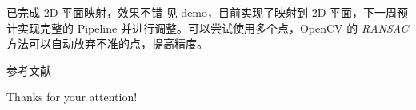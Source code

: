 \documentclass{ctexbeamer}
\begin{document}
\begin{frame}{已完成 2D 平面映射，效果不错}
见 demo，目前实现了映射到 2D 平面，下一周预计实现完整的 Pipeline 并进行调整。可以尝试使用多个点，OpenCV 的 \textit{RANSAC} 方法可以自动放弃不准的点，提高精度。
\end{frame}

\begin{frame}[allowframebreaks]{参考文献}
  
  
\end{frame}

\begin{frame}
  \begin{center}
    {\Huge\calligra Thanks for your attention!}
  \end{center}
\end{frame}

\end{document}
